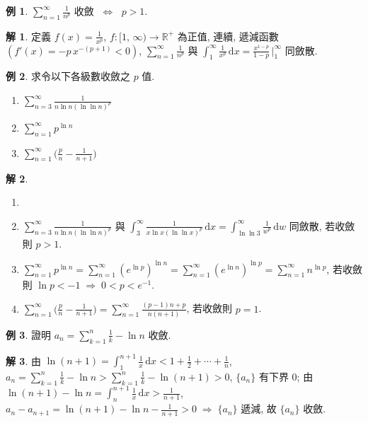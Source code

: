 \documentclass[12pt]{extarticle}
\newcommand{\ds}{\displaystyle}
\newcommand{\ie}{\;\Longrightarrow\;}
\newcommand{\ifff}{\;\Longleftrightarrow\;}
\theoremstyle{definition}
\newtheorem*{ex}{例}
\newtheorem*{sol}{解}
\begin{document}
\begin{ex}
  $\ds\sum_{n = 1}^\infty\frac{1}{n^p}$ 收斂 $\ifff$ $p > 1$. 
\end{ex}

\begin{sol}
  定義 $\ds f(x) = \frac{1}{x^p}$, $\ds f:[1,\,\infty)\to\mathbb{R}^+$ 為正值, 連續, 遞減函數 $\ds(f'(x) = -p\,x^{-(p + 1)} < 0)$, $\ds\sum_{n = 1}^\infty\frac{1}{n^p}$ 與 $\ds\int_1^\infty\frac{1}{x^p}\,\text{d}x = \frac{x^{1 - p}}{1 - p}\,\bigg|_1^\infty$ 同斂散. 
\end{sol}

\begin{ex} 求令以下各級數收斂之 $p$ 值. 
  \begin{multicols}{3}
    \begin{enumerate}\setlength{\itemsep}{0pt}
      \item $\ds\sum_{n = 3}^\infty\frac{1}{n\ln n(\ln\ln n)^p}$
      \item $\ds\sum_{n = 1}^\infty p^{\ln n}$
      \item $\ds\sum_{n = 1}^\infty\Big(\frac{p}{n} - \frac{1}{n + 1}\Big)$
    \end{enumerate}
  \end{multicols}
\end{ex}

\begin{sol}
  \begin{enumerate}\setlength{\itemsep}{0pt}
    \item[]
    \item $\ds\sum_{n = 3}^\infty\frac{1}{n\ln n(\ln\ln n)^p}$ 與 $\ds\int_{3}^\infty\frac{1}{x\ln x(\ln\ln x)^p}\,\text{d}x = \int_{\ln\ln 3}^\infty\frac{1}{w^p}\,\text{d}w$ 同斂散, 若收斂則 $p > 1$. 
    \item $\ds\sum_{n = 1}^\infty p^{\ln n} = \sum_{n = 1}^\infty (e^{\ln p})^{\ln n} = \sum_{n = 1}^\infty (e^{\ln n})^{\ln p} = \sum_{n = 1}^\infty n^{\ln p}$, 若收斂則 $\ln p < -1 \ie 0 < p < e^{-1}$. 
    \item $\ds\sum_{n = 1}^\infty\Big(\frac{p}{n} - \frac{1}{n + 1}\Big) = \sum_{n = 1}^\infty\frac{(p - 1) n + p}{n(n + 1)}$, 若收斂則 $p = 1$. 
  \end{enumerate}
\end{sol}

\begin{ex}
  證明 $\ds a_n = \sum_{k = 1}^n\frac{1}{k} - \ln n$ 收斂. 
\end{ex}

\begin{sol}
  由 $\ds\ln(n + 1) = \int_1^{n + 1}\frac{1}{x}\,\text{d}x < 1 + \frac{1}{2} + \cdots + \frac{1}{n}$, $\ds a_n = \sum_{k = 1}^n\frac{1}{k} - \ln n > \sum_{k = 1}^n\frac{1}{k} - \ln(n + 1) > 0$, $\{a_n\}$ 有下界 $0$; 由 $\ds\ln(n + 1) - \ln n = \int_n^{n + 1}\frac{1}{x}\,\text{d}x > \frac{1}{n + 1}$, $\ds a_n - a_{n + 1} = \ln(n + 1) - \ln n - \frac{1}{n + 1} > 0 \ie \{a_n\}$ 遞減, 故 $\{a_n\}$ 收斂. 
\end{sol}
\end{document}

